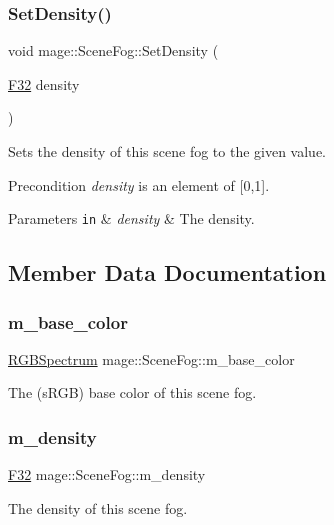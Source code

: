 \subsubsection{\texorpdfstring{Set\+Density()}{SetDensity()}}
{\footnotesize\ttfamily void mage\+::\+Scene\+Fog\+::\+Set\+Density (\begin{DoxyParamCaption}\item[{\hyperlink{namespacemage_aa97e833b45f06d60a0a9c4fc22ae02c0}{F32}}]{density }\end{DoxyParamCaption})\hspace{0.3cm}{\ttfamily [noexcept]}}

Sets the density of this scene fog to the given value.

\begin{DoxyPrecond}{Precondition}
{\itshape density} is an element of \mbox{[}0,1\mbox{]}. 
\end{DoxyPrecond}

\begin{DoxyParams}[1]{Parameters}
\mbox{\tt in}  & {\em density} & The density. \\
\hline
\end{DoxyParams}


\subsection{Member Data Documentation}
\hypertarget{classmage_1_1_scene_fog_a8cfaf40b3ee14359d4efdeba858d5cab}{}\label{classmage_1_1_scene_fog_a8cfaf40b3ee14359d4efdeba858d5cab} 
\subsubsection{\texorpdfstring{m\+\_\+base\+\_\+color}{m\_base\_color}}
{\footnotesize\ttfamily \hyperlink{structmage_1_1_r_g_b_spectrum}{R\+G\+B\+Spectrum} mage\+::\+Scene\+Fog\+::m\+\_\+base\+\_\+color\hspace{0.3cm}{\ttfamily [private]}}

The (s\+R\+GB) base color of this scene fog. \hypertarget{classmage_1_1_scene_fog_a16d4e67f373716f100ed6809c387b74c}{}\label{classmage_1_1_scene_fog_a16d4e67f373716f100ed6809c387b74c} 
\subsubsection{\texorpdfstring{m\+\_\+density}{m\_density}}
{\footnotesize\ttfamily \hyperlink{namespacemage_aa97e833b45f06d60a0a9c4fc22ae02c0}{F32} mage\+::\+Scene\+Fog\+::m\+\_\+density\hspace{0.3cm}{\ttfamily [private]}}

The density of this scene fog. 